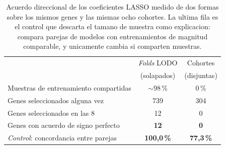 \begin{table}[htbp]
\centering
\caption[Consistencia de signo: folds solapados frente a cohortes disjuntas]{
Acuerdo direccional de los coeficientes LASSO medido de dos formas sobre los
mismos genes y las mismas ocho cohortes. La ultima fila es el control que
descarta el tamano de muestra como explicacion: compara parejas de modelos con
entrenamientos de magnitud comparable, y unicamente cambia si comparten muestras.}
\label{tab:falacia}
\small
\begin{tabular}{lcc}
\toprule
& \emph{Folds} LODO & Cohortes \\
& (solapados) & (disjuntas) \\
\midrule
Muestras de entrenamiento compartidas & $\sim$98\,\% & 0\,\% \\
Genes seleccionados alguna vez & 739 & 304 \\
Genes seleccionados en las 8 & 12 & 0 \\
Genes con acuerdo de signo perfecto & \textbf{12} & \textbf{0} \\
\midrule
\emph{Control}: concordancia entre parejas & \textbf{100,0\,\%} & \textbf{77,3\,\%} \\
\bottomrule
\end{tabular}
\end{table}
